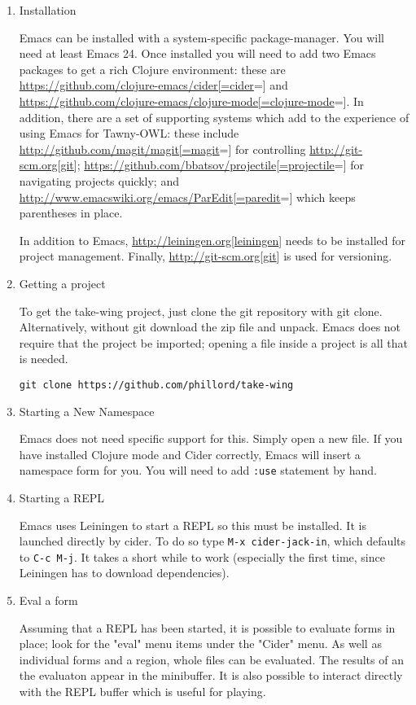 \begin{enumerate}
\item Installation
\label{sec-6-1-1-1}

Emacs can be installed with a system-specific package-manager. You will
need at least Emacs 24. Once installed you will need to add two Emacs
packages to get a rich Clojure environment: these are
\url{https://github.com/clojure-emacs/cider[=cider}=] and
\url{https://github.com/clojure-emacs/clojure-mode[=clojure-mode}=]. In
addition, there are a set of supporting systems which add to the
experience of using Emacs for Tawny-OWL: these include
\url{http://github.com/magit/magit[=magit}=] for controlling
\url{http://git-scm.org[git}];
\url{https://github.com/bbatsov/projectile[=projectile}=] for navigating
projects quickly; and \url{http://www.emacswiki.org/emacs/ParEdit[=paredit}=]
which keeps parentheses in place.

In addition to Emacs, \url{http://leiningen.org[leiningen}] needs to be
installed for project management. Finally, \url{http://git-scm.org[git}] is
used for versioning.

\item Getting a project
\label{sec-6-1-1-2}

To get the take-wing project, just clone the git repository with git
clone. Alternatively, without git download the zip file and unpack.
Emacs does not require that the project be imported; opening a file
inside a project is all that is needed.

\begin{verbatim}
git clone https://github.com/phillord/take-wing
\end{verbatim}


\item Starting a New Namespace
\label{sec-6-1-1-3}

Emacs does not need specific support for this. Simply open a new file.
If you have installed Clojure mode and Cider correctly, Emacs will
insert a namespace form for you. You will need to add \texttt{:use} statement
by hand.

\item Starting a REPL
\label{sec-6-1-1-4}

Emacs uses Leiningen to start a REPL so this must be installed. It is
launched directly by cider. To do so type \texttt{M-x cider-jack-in}, which
defaults to \texttt{C-c M-j}. It takes a short while to work (especially the
first time, since Leiningen has to download dependencies).

\item Eval a form
\label{sec-6-1-1-5}

Assuming that a REPL has been started, it is possible to evaluate forms
in place; look for the "eval" menu items under the "Cider" menu. As well
as individual forms and a region, whole files can be evaluated. The
results of an the evaluaton appear in the minibuffer. It is also
possible to interact directly with the REPL buffer which is useful for
playing.
\end{enumerate}

